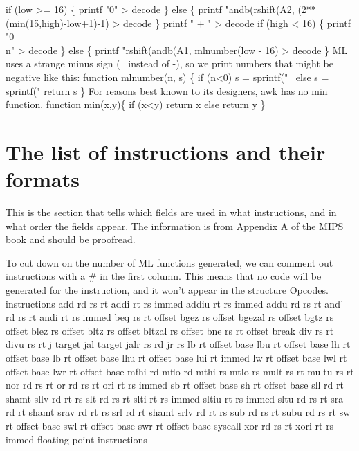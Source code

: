 \endcode
{}
\endmoddef
if (low >= 16) \{
        printf "0" > decode
\} else \{
        printf "andb(rshift(A2,%
                        (2**(min(15,high)-low+1)-1) > decode
\}
printf " + " > decode
if (high < 16) \{
        printf "0\\n" > decode
\} else \{
        printf "rshift(andb(A1,%
                        mlnumber(low - 16) > decode
\}
\endcode
{}
ML uses a strange minus sign (\code{}~\edoc{} instead of \code{}-\edoc{}), 
so we print numbers that might be negative like this:
\enddocs
{}
\endmoddef
function mlnumber(n, s) \{
        if (n<0) s = sprintf("~%
        else s = sprintf("%
        return s
\}
\endcode
{}
For reasons best known to its designers, awk has no \code{}min\edoc{} function.
\enddocs
{}
\endmoddef
function min(x,y)\{
        if (x<y) return x
        else return y
\}
\endcode
{}
\section{The list of instructions and their formats}
This is the section that tells which fields are used in what instructions,
and in what order the fields appear.
The information is from Appendix A
of the MIPS book and should be proofread.

To cut down on the number of ML functions generated, we can comment out
instructions with a \code{}#\edoc{} in the first column.
This means that no code will be generated for the instruction, and
it won't appear in the \code{}structure Opcodes\edoc{}.
\enddocs
{}
\endmoddef
                        instructions
add rd rs rt
addi rt rs immed
addiu rt rs immed
addu rd rs rt
and' rd rs rt
andi rt rs immed
beq rs rt offset
bgez rs offset
bgezal rs offset
bgtz rs offset
blez rs offset
bltz rs offset
bltzal rs offset
bne rs rt offset
break
div rs rt
divu rs rt
j target
jal target
jalr rs rd
jr rs
lb rt offset base
lbu rt offset base
lh rt offset base
lb rt offset base
lhu rt offset base
lui rt immed
lw rt offset base
lwl rt offset base
lwr rt offset base
mfhi rd
mflo rd
mthi rs
mtlo rs
mult rs rt
multu rs rt
nor rd rs rt
or rd rs rt
ori rt rs immed
sb rt offset base
sh rt offset base
sll rd rt shamt
sllv rd rt rs
slt rd rs rt
slti rt rs immed
sltiu rt rs immed
sltu rd rs rt
sra rd rt shamt
srav rd rt rs
srl rd rt shamt
srlv rd rt rs
sub rd rs rt
subu rd rs rt
sw rt offset base
swl rt offset base
swr rt offset base
syscall
xor rd rs rt
xori rt rs immed
\LA{}floating point instructions\RA{}


